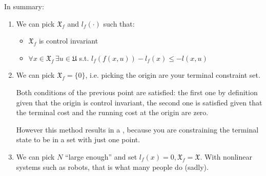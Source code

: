 In summary:
\begin{enumerate}
\item We can pick $\mathfrak{X}_f$ and $l_f(\cdot)$ such that:
\begin{itemize}
\item $\mathfrak{X}_f$ is control invariant
\item $\forall x \in \mathfrak{X}_f\,\exists u \in \mathfrak{U}$ s.t. $l_f(f(x,u)) - l_f(x) \le - l(x,u)$
\end{itemize}
\item We can pick $\mathfrak{X}_f = \{0\}$, i.e. picking the origin are your terminal constraint set.

Both conditions of the previous point are satisfied: the first one by definition given that the origin is control invariant, the second one is satisfied given that the terminal cost and the running cost at the origin are zero.

However this method results in a , because you are constraining the terminal state to be in a set with just one point.
\item  We can pick $N$ ``large enough'' and set $l_f(x) = 0, \mathfrak{X}_f = \mathfrak{X}$. With nonlinear systems such as robots, that is what many people do (sadly).
\end{enumerate}


